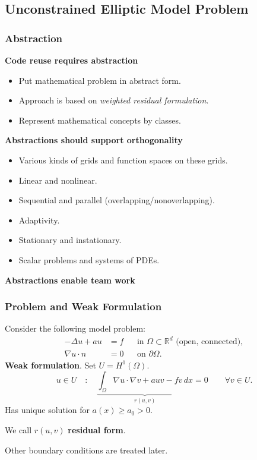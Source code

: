 
\subsection{Unconstrained Elliptic Model Problem}

\begin{frame}
\frametitle<presentation>{Abstraction}
\textbf{Code reuse requires abstraction}
\begin{itemize}
\item Put mathematical problem in abstract form.
\item Approach is based on \textit{weighted residual formulation}.
\item Represent mathematical concepts by classes.
\end{itemize}
\textbf{Abstractions should support orthogonality}
\begin{itemize}
\item Various kinds of grids and function spaces on these grids.
\item Linear and nonlinear.
\item Sequential and parallel (overlapping/nonoverlapping).
\item Adaptivity.
\item Stationary and instationary.
\item Scalar problems and systems of PDEs.
\end{itemize}
\textbf{Abstractions enable team work}
\end{frame}


\begin{frame}
\frametitle{Problem and Weak Formulation}
Consider the following model problem:
\begin{subequations} \label{Eq:Example01}
\begin{align}
-\Delta u + a u &= f &&\text{in $\Omega\subset\mathbb{R}^d$ (open, connected)},\\
\nabla u \cdot n &= 0 &&\text{on $\partial\Omega$}.
\end{align}
\end{subequations}
\medskip
\textbf{Weak formulation}. Set $U = H^1(\Omega)$.
\begin{equation*}
u\in U \quad : \quad \underbrace{\int_\Omega \nabla u \cdot \nabla v +
a u v - f v \,dx}_{r(u,v)} = 0 \qquad \forall v\in U.
\end{equation*}
Has unique solution for $a(x)\geq a_0>0$.

We call $r(u,v)$ \textbf{residual form}.

Other boundary conditions are treated later.
\end{frame}

